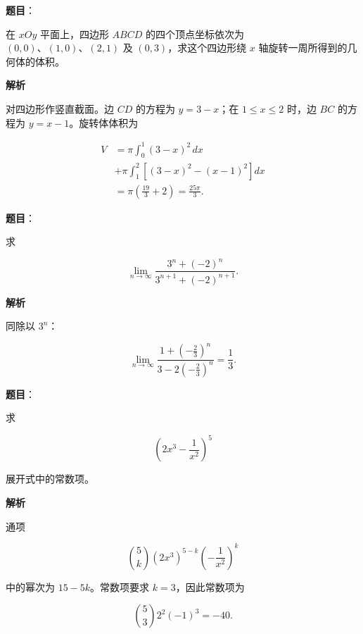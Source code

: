 \begin{answer}

\textbf{题目}：

在 $xOy$ 平面上，四边形 $ABCD$ 的四个顶点坐标依次为 $(0,0)\text{、}(1,0)\text{、}(2,1)$ 及 $(0,3)$，求这个四边形绕 $x$ 轴旋转一周所得到的几何体的体积。

\textbf{解析}

对四边形作竖直截面。边 $CD$ 的方程为 $y=3-x$；在 $1\le x\le2$ 时，边 $BC$ 的方程为 $y=x-1$。旋转体体积为

\nopagebreak[4]
\[
\begin{aligned}
V
&=\pi\int_0^1(3-x)^2\,dx\\
&+\pi\int_1^2\left[(3-x)^2-(x-1)^2\right]dx\\
&=\pi\left(\frac{19}{3}+2\right)
=\frac{25\pi}{3}.
\end{aligned}
\]


\end{answer}
\begin{answer}

\textbf{题目}：

求

\nopagebreak[4]
\[
\lim_{n\to\infty}\frac{3^n+(-2)^n}{3^{n+1}+(-2)^{n+1}}.
\]

\textbf{解析}

同除以 $3^n$：

\nopagebreak[4]
\[
\lim_{n\to\infty}
\frac{1+\left(-\frac23\right)^n}
{3-2\left(-\frac23\right)^n}
=\frac13.
\]


\end{answer}
\begin{answer}

\textbf{题目}：

求

\nopagebreak[4]
\[
\left(2x^3-\frac1{x^2}\right)^5
\]

展开式中的常数项。

\textbf{解析}

通项

\nopagebreak[4]
\[
\binom5k(2x^3)^{5-k}\left(-\frac1{x^2}\right)^k
\]

中的幂次为 $15-5k$。常数项要求 $k=3$，因此常数项为

\nopagebreak[4]
\[
\binom53 2^2(-1)^3=-40.
\]


\end{answer}
